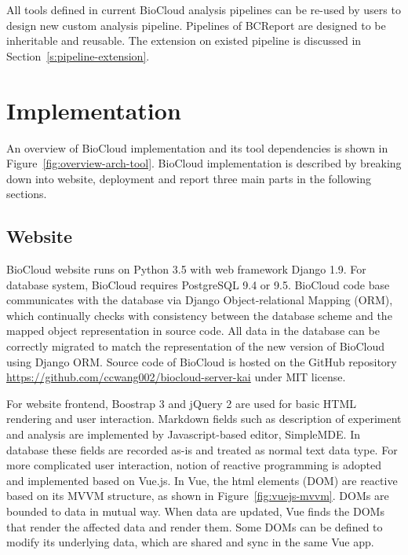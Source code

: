 All tools defined in current BioCloud analysis pipelines can be re-used by
users to design new custom analysis pipeline. Pipelines of BCReport are
designed to be inheritable and reusable. The extension on existed pipeline is
discussed in Section~\ref{s:pipeline-extension}.



\section{Implementation}



An overview of BioCloud implementation and its tool dependencies is shown in
Figure~\ref{fig:overview-arch-tool}. BioCloud implementation is described by
breaking down into website, deployment and report three main parts in the
following sections.


\subsection{Website}

BioCloud website runs on Python 3.5 with web framework Django 1.9. For database
system, BioCloud requires PostgreSQL 9.4 or 9.5. BioCloud code base
communicates with the database via Django Object-relational Mapping (ORM),
which continually checks with consistency between the database scheme and the
mapped object representation in source code. All data in the database can be
correctly migrated to match the representation of the new version of BioCloud
using Django ORM. Source code of BioCloud is hosted on the GitHub repository
\url{https://github.com/ccwang002/biocloud-server-kai} under MIT license.

For website frontend, Boostrap 3 and jQuery 2 are used for basic HTML
rendering and user interaction. Markdown fields such as description of
experiment and analysis are implemented by Javascript-based editor, SimpleMDE.
In database these fields are recorded as-is and treated as normal text
data type. For more complicated user interaction, notion of reactive
programming is adopted and implemented based on Vue.js. In Vue, the html
elements (DOM) are reactive based on its MVVM structure, as shown in
Figure~\ref{fig:vuejs-mvvm}. DOMs are bounded to data in mutual way. When data
are updated, Vue finds the DOMs that render the affected data and render
them. Some DOMs can be defined to modify its underlying data, which are shared
and sync in the same Vue app.

